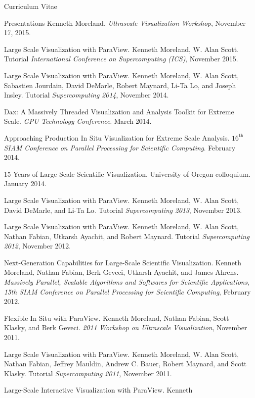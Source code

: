 \documentclass{article}
\begin{document}
\begin{cv}{Curriculum Vitae}
\begin{cvlist}{Presentations}
      Kenneth Moreland.
      \emph{Ultrascale Visualization Workshop}, November 17, 2015.
    \item[Large Scale Visualization with ParaView.] Kenneth Moreland, W.
      Alan Scott. Tutorial \emph{International Conference on Supercomputing
        (ICS)}, November 2015.
    \item[Large Scale Visualization with ParaView.] Kenneth Moreland, W.
      Alan Scott, Sabastien Jourdain, David DeMarle, Robert Maynard, Li-Ta
      Lo, and Joseph Insley. Tutorial \emph{Supercomputing 2014}, November
      2014.
    \item[Dax: A Massively Threaded Visualization and Analysis Toolkit for
      Extreme] Scale. \emph{GPU Technology Conference}. March 2014.
    \item[Approaching Production In Situ Visualization for Extreme Scale
      Analysis.] \emph{$16^{\mathrm{th}}$ SIAM Conference on Parallel
      Processing for Scientific Computing}. February 2014.
    \item[15 Years of Large-Scale Scientific Visualization.] University of
      Oregon colloquium. January 2014.
    \item[Large Scale Visualization with ParaView.] Kenneth Moreland, W.
      Alan Scott, David DeMarle, and Li-Ta Lo. Tutorial
      \emph{Supercomputing 2013}, November 2013.
    \item[Large Scale Visualization with ParaView.] Kenneth Moreland,
      W. Alan Scott, Nathan Fabian, Utkarsh Ayachit, and Robert
      Maynard. Tutorial \emph{Supercomputing 2012}, November 2012.
    \item[Next-Generation Capabilities for Large-Scale Scientific
      Visualization.] Kenneth Moreland, Nathan Fabian, Berk Geveci, Utkarsh
      Ayachit, and James Ahrens. \emph{Massively Parallel, Scalable
        Algorithms and Softwares for Scientific Applications, 15th SIAM
        Conference on Parallel Processing for Scientific Computing},
      February 2012.
    \item[Flexible In Situ with ParaView.] Kenneth Moreland, Nathan Fabian,
      Scott Klasky, and Berk Geveci. \emph{2011 Workshop on Ultrascale
        Visualization}, November 2011.
    \item[Large Scale Visualization with ParaView.] Kenneth Moreland,
      W. Alan Scott, Nathan Fabian, Jeffrey Mauldin, Andrew C. Bauer,
      Robert Maynard, and Scott Klasky. Tutorial \emph{Supercomputing
        2011}, November 2011.
    \item[Large-Scale Interactive Visualization with ParaView.] Kenneth

\end{cvlist}
\end{cv}
\end{document}
